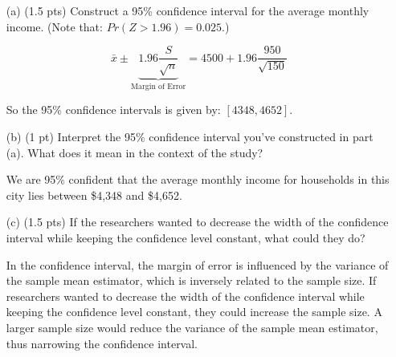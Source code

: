 \documentclass{./../../Latex/tests}
\begin{document}
\begin{enumerate}

\item[(a)] (1.5 pts) Construct a 95\% confidence interval for the average monthly income. (Note that: $Pr(Z>1.96) = 0.025$.)

$$ \bar{x} \pm \underbrace{1.96 \frac{S}{\sqrt{n}}}_{\text{Margin of Error}} = 4500 + 1.96 \frac{950}{\sqrt{150}} $$

So the 95\% confidence intervals is given by: $[4348, 4652]$. 

\item[(b)] (1 pt)  Interpret the 95\% confidence interval you've constructed in part (a). What does it mean in the context of the study?

We are 95\% confident that the average monthly income for households in this city lies between \$4,348 and \$4,652. 
\item[(c)] (1.5 pts) If the researchers wanted to decrease the width of the confidence interval while keeping the confidence level constant, what could they do? 

In the confidence interval, the margin of error is influenced by the variance of the sample mean estimator, which is inversely related to the sample size. If researchers wanted to decrease the width of the confidence interval while keeping the confidence level constant, they could increase the sample size. A larger sample size would reduce the variance of the sample mean estimator, thus narrowing the confidence interval.

\end{enumerate}
\end{document}
